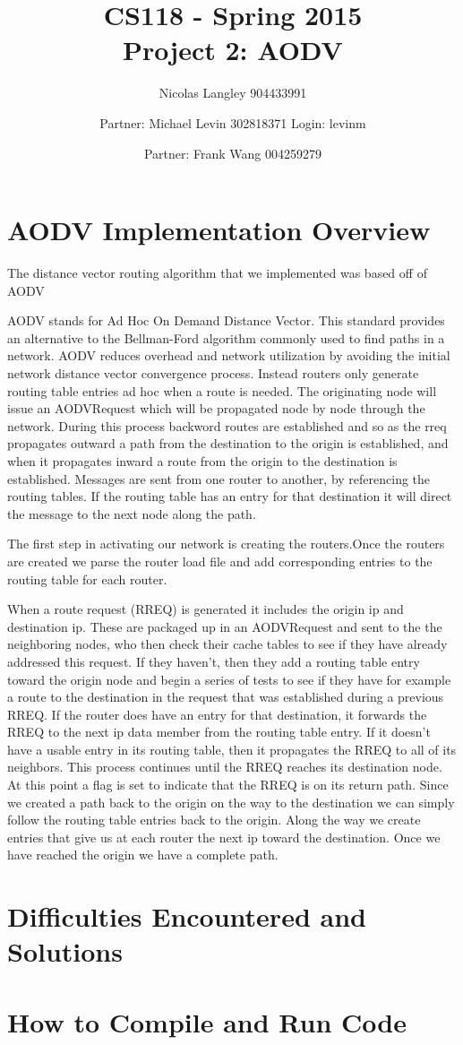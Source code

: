 \documentclass[12pt, titlepage]{article}
\begin{document}
\title{CS118 - Spring 2015 \\
Project 2: AODV}
\author{Nicolas Langley 904433991 \and Partner: Michael Levin 302818371 Login: levinm \and Partner: Frank Wang 004259279}

\maketitle
\section{AODV Implementation Overview}

The distance vector routing algorithm that we implemented was based off of AODV

AODV stands for Ad Hoc On Demand Distance Vector.
This standard provides an alternative to the Bellman-Ford algorithm commonly used to find paths in a network.
AODV reduces overhead and network utilization by avoiding the initial network distance vector convergence process.
Instead routers only generate routing table entries ad hoc when a route is needed.  The originating node will issue an AODVRequest which will be propagated node by node through the network. During this process backword routes are established and so as the rreq propagates outward a path from the destination to the origin is established, and when it propagates inward a route from the origin to the destination is established.  Messages are sent from one router to another, by referencing the routing tables.  If the routing table has an entry for that destination it will direct the message to the next node along the path.

The first step in activating our network is creating the routers.Once the routers are created we parse the router load file and add corresponding entries to the routing table for each router.


When a route request (RREQ) is generated it includes the origin ip and destination ip.  These are packaged up in an AODVRequest and sent to the the neighboring nodes, who then check their cache tables to see if they have already addressed this request.  If they haven't, then they add a routing table entry toward the origin node and begin a series of tests to see if they have for example a route to the destination in the request that was established during a previous RREQ.  If the router does have an entry for that destination, it forwards the RREQ to the next ip data member from the routing table entry.  If it doesn't have a usable entry in its routing table, then it propagates the RREQ to all of its neighbors.  This process continues until the RREQ reaches its destination node.  At this point a flag is set to indicate that the RREQ is on its return path.  Since we created a path back to the origin on the way to the destination we can simply follow the routing table entries back to the origin.  Along the way we create entries that give us at each router the next ip toward the destination.  Once we have reached the origin we have a complete path.



\section{Difficulties Encountered and Solutions}



\section{How to Compile and Run Code}
\end{document}
